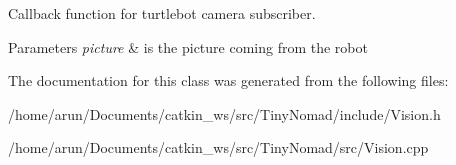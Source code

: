 Callback function for turtlebot camera subscriber. 


\begin{DoxyParams}{Parameters}
{\em picture} & is the picture coming from the robot \\
\hline
\end{DoxyParams}


The documentation for this class was generated from the following files\+:\begin{DoxyCompactItemize}
\item 
/home/arun/\+Documents/catkin\+\_\+ws/src/\+Tiny\+Nomad/include/Vision.\+h\item 
/home/arun/\+Documents/catkin\+\_\+ws/src/\+Tiny\+Nomad/src/Vision.\+cpp\end{DoxyCompactItemize}
